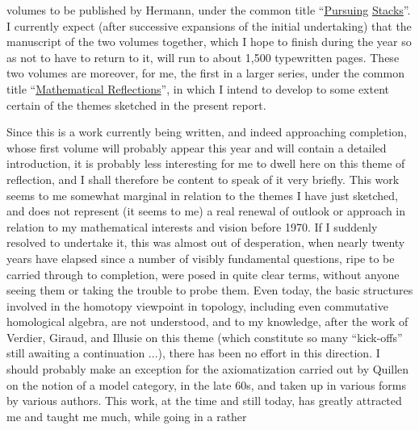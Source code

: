 
volumes to be published by Hermann, under the common title ``\uline{Pursuing}
\uline{Stacks}''. I currently expect (after successive expansions
of the initial undertaking) that the manuscript of the two
volumes together, which I hope to finish during the year so as not
to have to return to it, will run to about 1,500 typewritten pages.
These two volumes are moreover, for me, the first in a
larger series, under the common title ``\uline{Mathematical Reflections}'',
in which I intend to develop to some extent certain of the themes sketched
in the present report.

Since this is a work currently being written,
and indeed approaching completion, whose first volume will probably appear
this year and will contain a detailed introduction, it
is probably less interesting for me to dwell here on this theme
of reflection, and I shall therefore be content to speak of it very briefly.
This work seems to me somewhat marginal in relation to the themes
I have just sketched, and does not represent (it seems to me)
a real renewal of outlook or approach in relation to
my mathematical interests and vision before 1970. If I
suddenly resolved to undertake it, this was almost out of desperation,
when nearly twenty years have elapsed since a number of visibly
fundamental questions, ripe to be carried through to completion,
were posed in quite clear terms, without
anyone seeing them or taking the trouble to probe them. Even
today, the basic structures involved in the
homotopy viewpoint in topology, including even commutative
homological algebra, are not understood, and to my
knowledge, after the work of Verdier, Giraud, and Illusie on
this theme (which constitute so many ``kick-offs'' still
awaiting a continuation ...), there has been no effort in this direction. I
should probably make an exception for the axiomatization
carried out by Quillen on the notion of a model category, in
the late 60s, and taken up in various forms by
various authors. This work, at the time and still today, has
greatly attracted me and taught me much, while going in a rather

